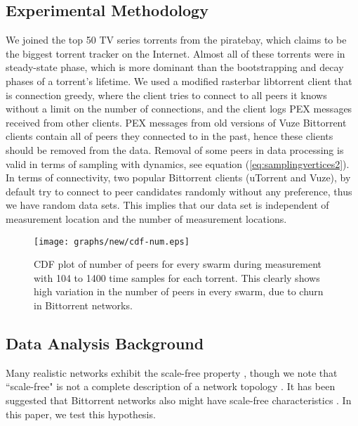 \documentclass[paper]{ieice}
\begin{document}
\subsection{Experimental Methodology}
We joined the top 50 TV series torrents from the piratebay, which claims to be the biggest torrent tracker on the Internet.
Almost all of these torrents were in steady-state phase, which is more dominant than the bootstrapping and decay phases of a torrent's lifetime.
We used a modified rasterbar libtorrent \cite{rasterbar} client that is connection greedy, where the client tries to connect to all peers it knows without a limit on the number of connections, and the client logs PEX messages received from other clients.
PEX messages from old versions of Vuze Bittorrent clients contain all of peers they connected to in the past, hence these clients should be removed from the data.
Removal of some peers in data processing is valid in terms of sampling with dynamics, see equation (\ref{eq:samplingvertices2}).
In terms of connectivity, two popular Bittorrent clients (uTorrent and Vuze), by default try to connect to peer candidates randomly without any preference, thus we have random data sets.
This implies that our data set is independent of measurement location and the number of measurement locations.

\begin{figure}[tb]
\begin{center}
\texttt{[image: graphs/new/cdf-num.eps]}
\end{center}
\caption{CDF plot of number of peers for every swarm during measurement with 104 to 1400 time samples for each torrent. This clearly shows high variation in the number of peers in every swarm, due to churn in Bittorrent networks.} 
\label{fig:num_peers}
\end{figure}

\subsection{Data Analysis Background}
Many realistic networks exhibit the scale-free property \cite{clauset2009power}, though we note that ``scale-free" is not a complete description of a network topology \cite{doyle2005robust}\cite{mahadevan2006systematic}. 
It has been suggested that Bittorrent networks also might have scale-free characteristics \cite{dale2008evolution}. 
In this paper, we test this hypothesis. 
\end{document}
